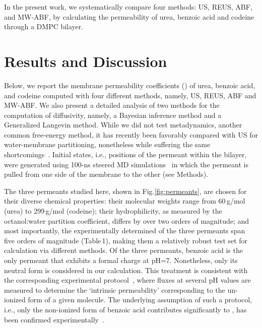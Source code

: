 \par In the present work, we systematically compare four methods: US, REUS, ABF, and MW-ABF, by calculating the permeability of urea, benzoic acid and codeine through a DMPC bilayer.


\section{Results and Discussion}
Below, we report the membrane permeability coefficients (\perm) of urea, benzoic acid, and codeine computed with four different methods, namely, US, REUS, ABF and MW-ABF.  We also present a detailed analysis of two methods for the computation of diffusivity, namely, a Bayesian inference method and a Generalized Langevin method. While we did not test metadynamics, another common free-energy method, it has recently been favorably compared with US for water-membrane partitioning, nonetheless while suffering the same shortcomings~\cite{Bochicchio2015}.  Initial states, i.e., positions of the permeant within the bilayer, were generated using 100-ns steered MD simulations~\cite{Izrailev1997,Sotomayor2007} in which the permeant is pulled from one side of the membrane to the other (see Methods).


The three permeants studied here, shown in Fig.\ref{fig:permeants}, are chosen for their diverse chemical properties:
their molecular weights range from 60\,g/mol (urea) to 299\,g/mol (codeine);
their hydrophilicity, as measured by the octanol:water partition coefficient, differs by over two orders of magnitude;
and most importantly, the experimentally determined \perm of the three permeants span five orders of magnitude (Table\,1), making them a relatively robust test set for \perm calculation via different methods. Of the three permeants, benzoic acid is the only permeant that exhibits a formal charge at pH=7. Nonetheless, only its neutral form is considered in our calculation. This treatment is consistent with the corresponding experimental protocol~\cite{Walter1984}, where fluxes at several pH values are measured to determine the `intrinsic permeability' corresponding to the un-ionized form of a given molecule. The underlying assumption of such a protocol, i.e., only the non-ionized form of benzoic acid contributes significantly to \perm, has been confirmed experimentally~\cite{Walter1984}.

